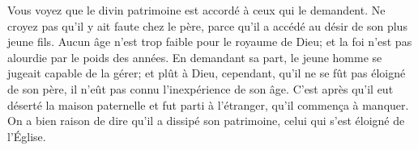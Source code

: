 Vous voyez que le divin patrimoine est accordé à ceux qui le demandent.
Ne croyez pas qu’il y ait faute chez le père,
	parce qu’il a accédé au désir de son plus jeune fils.
Aucun âge n’est trop faible pour le royaume de Dieu;
	et la foi n’est pas alourdie par le poids des années.
En demandant sa part, le jeune homme se jugeait capable de la gérer;
	et plût à Dieu, cependant, qu’il ne se fût pas éloigné de son père,
	il n’eût pas connu l’inexpérience de son âge.
C’est après qu’il eut déserté la maison paternelle et fut parti à l’étranger,
	qu’il commença à manquer.
On a bien raison de dire qu’il a dissipé son patrimoine,
	celui qui s’est éloigné de l’Église.
